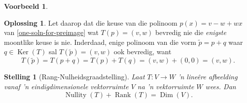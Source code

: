 \documentclass[a4paper,11pt]{book}
\newtheorem{theorem}{Stelling}
\theoremstyle{definition}
\newtheorem{example_environment}{Voorbeeld}[chapter]
\newtheorem*{solution}{Oplossing}
\newenvironment{example}
	{
		\begin{oframed}
		\begin{example_environment}
	}
	{
		\end{example_environment}
		\end{oframed}
	}
\DeclareMathOperator{\Dim}{Dim}
\DeclareMathOperator{\Ker}{Ker}
\DeclareMathOperator{\Nullity}{Nullity}
\DeclareMathOperator{\Rank}{Rank}
\begin{document}
\begin{example}
\begin{solution}
		Let daarop dat die keuse van die polinoom $p(x) = v-w + w x$ van
		\eqref{one-soln-for-preimage} wat $T(p) = (v,w)$ bevredig nie die
		\emph{enigste} moontlike keuse is nie. Inderdaad, enige polinoom
		van die vorm $\tilde{p} = p + q$ waar $q \in \Ker(T)$ sal
		$T(\tilde{p}) = (v,w)$ ook bevredig, want
		\[
			T(\tilde{p}) = T(p + q) = T(p) + T(q) = (v,w) + (0,0) = (v,w).
		\]
	\end{solution}
\end{example}

\begin{theorem}[Rang-Nulheidsgraadstelling] \label{rank-nullity-theorem}
	Laat $T : V \rightarrow W$ 'n line{\^e}re afbeelding vanaf 'n
	eindigdimensionele vektorruimte $V$ na 'n vektorruimte $W$ wees. Dan
	\[
		\Nullity(T) + \Rank(T) = \Dim(V).
	\]
\end{theorem}
\end{document}
